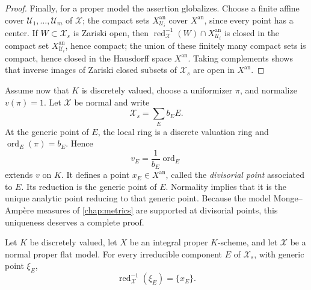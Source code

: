 \begin{proof}
Finally, for a proper model the assertion globalizes.  Choose a finite
affine cover $\mathcal U_1,\ldots,\mathcal U_m$ of $\mathcal X$; the
compact sets $X^{\mathrm{an}}_{\mathcal U_i}$ cover
$X^{\mathrm{an}}$, since every point has a center.  If
$W\subset\mathcal X_s$ is Zariski open, then
$\operatorname{red}_{\mathcal X}^{-1}(W)\cap
X^{\mathrm{an}}_{\mathcal U_i}$ is closed in the compact set
$X^{\mathrm{an}}_{\mathcal U_i}$, hence compact; the union of these
finitely many compact sets is compact, hence closed in the Hausdorff
space $X^{\mathrm{an}}$.  Taking complements shows that inverse images
of Zariski closed subsets of $\mathcal X_s$ are open in
$X^{\mathrm{an}}$.
\end{proof}

Assume now that $K$ is discretely valued, choose a uniformizer $\pi$, and
normalize $v(\pi)=1$. Let $\mathcal X$ be normal and write
\[
                        \mathcal X_s=\sum_E b_EE.
\]
At the generic point of $E$, the local ring is a discrete valuation ring
and $\operatorname{ord}_E(\pi)=b_E$. Hence
\[
                  v_E=\frac{1}{b_E}\operatorname{ord}_E
\]
extends $v$ on $K$. It defines a point $x_E\in X^{\mathrm{an}}$, called
the \emph{divisorial point} associated to $E$. Its reduction is the
generic point of $E$. Normality implies that it is the unique analytic
point reducing to that generic point.  Because the model Monge--Amp\`ere
measures of \cref{chap:metrics} are supported at divisorial points, this
uniqueness deserves a complete proof.

\begin{proposition}
\label{prop:berk-divisorial-fibre}
Let $K$ be discretely valued, let $X$ be an integral proper
$K$-scheme, and let $\mathcal X$ be a normal proper flat model.  For
every irreducible component $E$ of $\mathcal X_s$, with generic point
$\xi_E$,
\[
 \operatorname{red}_{\mathcal X}^{-1}(\xi_E)=\{x_E\}.
\]
\end{proposition}

